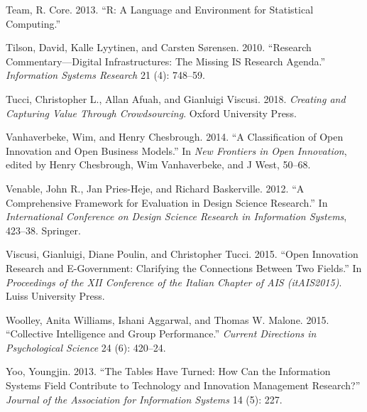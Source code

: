 \documentclass[]{elsarticle} %
\begin{document}
\hypertarget{ref-r._core_team_r:_2013}{}
Team, R. Core. 2013. ``R: A Language and Environment for Statistical
Computing.''

\hypertarget{ref-tilson_research_2010}{}
Tilson, David, Kalle Lyytinen, and Carsten Sørensen. 2010. ``Research
Commentary---Digital Infrastructures: The Missing IS Research Agenda.''
\emph{Information Systems Research} 21 (4): 748--59.

\hypertarget{ref-tucci_creating_2018}{}
Tucci, Christopher L., Allan Afuah, and Gianluigi Viscusi. 2018.
\emph{Creating and Capturing Value Through Crowdsourcing}. Oxford
University Press.

\hypertarget{ref-vanhaverbeke_classification_2014}{}
Vanhaverbeke, Wim, and Henry Chesbrough. 2014. ``A Classification of
Open Innovation and Open Business Models.'' In \emph{New Frontiers in
Open Innovation}, edited by Henry Chesbrough, Wim Vanhaverbeke, and J
West, 50--68.

\hypertarget{ref-venable_comprehensive_2012}{}
Venable, John R., Jan Pries-Heje, and Richard Baskerville. 2012. ``A
Comprehensive Framework for Evaluation in Design Science Research.'' In
\emph{International Conference on Design Science Research in Information
Systems}, 423--38. Springer.

\hypertarget{ref-viscusi_open_2015}{}
Viscusi, Gianluigi, Diane Poulin, and Christopher Tucci. 2015. ``Open
Innovation Research and E-Government: Clarifying the Connections Between
Two Fields.'' In \emph{Proceedings of the XII Conference of the Italian
Chapter of AIS (itAIS2015)}. Luiss University Press.

\hypertarget{ref-woolley_collective_2015}{}
Woolley, Anita Williams, Ishani Aggarwal, and Thomas W. Malone. 2015.
``Collective Intelligence and Group Performance.'' \emph{Current
Directions in Psychological Science} 24 (6): 420--24.

\hypertarget{ref-yoo_tables_2013}{}
Yoo, Youngjin. 2013. ``The Tables Have Turned: How Can the Information
Systems Field Contribute to Technology and Innovation Management
Research?'' \emph{Journal of the Association for Information Systems} 14
(5): 227.
\end{document}
